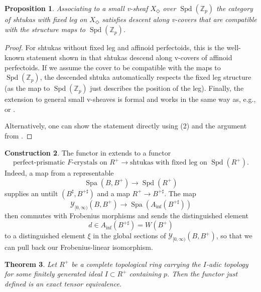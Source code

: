 \documentclass[10pt,twoside]{article}
\numberwithin{equation}{section}
\theoremstyle{plain}
\newtheorem{mythm}{Theorem}[section]
\newtheorem{myprop}[mythm]{Proposition}
\theoremstyle{definition}
\newtheorem{myconst}[mythm]{Construction}
\DeclareMathOperator{\Spa}{Spa}
\DeclareMathOperator{\Spd}{Spd}
\newcommand{\ZZ}{\mathbb{Z}}
\newcommand{\MCY}{\mathcal{Y}}
\let \diamond \Diamond
\DeclareMathOperator{\Inf}{inf}
\newcommand{\Ainf}{A_{\Inf}}
\newcommand{\Yco}{\MCY_{[0,\infty)}}
\begin{document}
\begin{myprop}\label{vDescentForShtukas}
Associating to a small v-sheaf \(X_\diamond\) over \(\Spd(\ZZ_p)\) the category of shtukas with fixed leg on \(X_\diamond\) satisfies descent along v-covers that are compatible with the structure maps to \(\Spd(\ZZ_p)\).
\end{myprop}

\begin{proof}
For shtukas without fixed leg and affinoid perfectoids, this is the well-known statement shown in \cite{SW20} that shtukas descend along v-covers of affinoid perfectoids. If we assume the cover to be compatible with the maps to \(\Spd(\ZZ_p)\), the descended shtuka automatically respects the fixed leg structure (as the map to \(\Spd(\ZZ_p)\) just describes the position of the leg). Finally, the extension to general small v-sheaves is formal and works in the same way as, e.g.,  or .\par
Alternatively, one can show the statement directly using (2) and the argument from .
\end{proof}






\begin{myconst}\label{FEquivalenceConst}
The functor in  extends to a functor
\[\text{perfect-prismatic \(F\)-crystals on }R^+
\longrightarrow\text{shtukas with fixed leg on }\Spd(R^+).\]
Indeed, a map from a representable
\[\Spa(B,B^+)\longrightarrow\Spd(R^+)\]
supplies an untilt \((B^\sharp,B^{+\sharp})\) and a map \(R^+\to B^{+\sharp}\). The map
\[\Yco(B,B^+)\longrightarrow \Spa(\Ainf(B^{+\sharp}))\]
then commutes with Frobenius morphisms and sends the distinguished element\[d\in\Ainf(B^{+\sharp})=W(B^+)\]to a distinguished element \(\xi\) in the global sections of \(\Yco(B,B^+)\), so that we can pull back our Frobenius-linear isomorphism.
\end{myconst}


\begin{mythm}\label{FEquivalenceThm}
Let \(R^+\) be a complete topological ring carrying the \(I\)-adic topology for some finitely generated ideal \(I\subset R^+\) containing \(p\). Then the functor just defined is an exact tensor equivalence.
\end{mythm}
\end{document}
